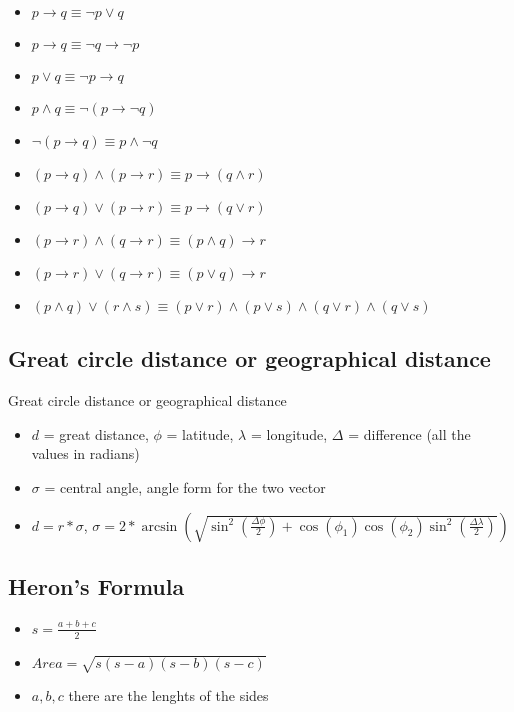 \documentclass[10pt,letterpaper,twocolumn,twosided]{article}
\begin{document}
\begin{itemize}
	\item $ p \rightarrow q \equiv \lnot p \lor q$
	\item $ p \rightarrow q \equiv \lnot q \rightarrow \lnot p$
	\item $ p \lor q \equiv \lnot p \rightarrow q$
	\item $ p \land q \equiv \lnot (p \rightarrow \lnot q)$
	\item $ \lnot (p \rightarrow q) \equiv p \land \lnot q$
	\item $ (p \rightarrow q) \land (p \rightarrow r) \equiv p \rightarrow (q \land r)$
	\item $ (p \rightarrow q) \lor (p \rightarrow r) \equiv p \rightarrow (q \lor r)$
	\item $ (p \rightarrow r) \land (q \rightarrow r) \equiv (p \land q) \rightarrow r$
	\item $ (p \rightarrow r) \lor (q \rightarrow r) \equiv (p \lor q) \rightarrow r$
	\item $(p \land q) \lor (r \land s) \equiv (p \lor r) \land (p \lor s) \land (q \lor r) \land (q \lor s)$
\end{itemize}


\subsection{Great circle distance or geographical distance}
Great circle distance or geographical distance
\begin{itemize}
\item $d$ = great distance, $\phi$ = latitude, $\lambda$ = longitude, $\Delta$ = difference (all the values in radians)
\item $\sigma$ = central angle, angle form for the two vector
\item $d = r * \sigma$, $\sigma = 2 * \arcsin(\sqrt{\sin^2(\frac{\Delta\phi}{2}) + \cos(\phi_1)\cos(\phi_2)\sin^2(\frac{\Delta\lambda}{2})})$
\end{itemize}


\subsection{Heron's Formula}
\begin{itemize}
\item $s = \frac{a+b+c}{2}$
\item $Area = \sqrt{s(s-a)(s-b)(s-c)}$
\item $a, b, c$ there are the lenghts of the sides
\end{itemize}
\end{document}
